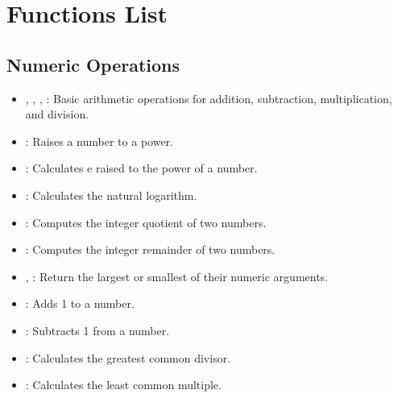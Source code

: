 
\section{Functions List}

\subsection{Numeric Operations}
\begin{itemize}
    \item \code{+}, \code{-}, \code{*}, \code{/}: Basic arithmetic operations for addition, subtraction, multiplication, and division.
    \item \code{**}: Raises a number to a power.
    \item {}: Calculates e raised to the power of a number.
    \item {}: Calculates the natural logarithm.
    \item {}: Computes the integer quotient of two numbers.
    \item {}: Computes the integer remainder of two numbers.
    \item {}, : Return the largest or smallest of their numeric arguments.
    \item {}: Adds 1 to a number.
    \item {}: Subtracts 1 from a number.
    \item {}: Calculates the greatest common divisor.
    \item {}: Calculates the least common multiple.
\end{itemize}

